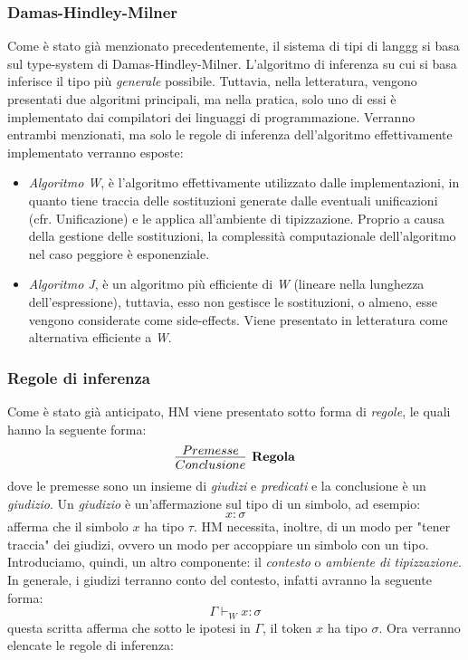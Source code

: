 \documentclass[10pt,a4paper]{article}
\begin{document}
\subsubsection{Damas-Hindley-Milner}
Come è stato già menzionato precedentemente, il sistema di tipi di langgg si basa sul type-system di Damas-Hindley-Milner.
L'algoritmo di inferenza su cui si basa inferisce il tipo più \textit{generale} possibile. Tuttavia, nella letteratura,
vengono presentati due algoritmi principali, ma nella pratica, solo uno di essi è implementato dai compilatori dei
linguaggi di programmazione. Verranno entrambi menzionati, ma solo le regole di inferenza dell'algoritmo effettivamente
implementato verranno esposte:
\begin{itemize}
    \item \textit{Algoritmo W}, è l'algoritmo effettivamente utilizzato dalle implementazioni, in quanto tiene traccia
    delle sostituzioni generate dalle eventuali unificazioni (cfr. Unificazione) e le applica all'ambiente di
    tipizzazione. Proprio a causa della gestione delle sostituzioni, la complessità computazionale dell'algoritmo
    nel caso peggiore è esponenziale.
    \item \textit{Algoritmo J}, è un algoritmo più efficiente di \textit{W} (lineare nella lunghezza dell'espressione),
    tuttavia, esso non gestisce le sostituzioni, o almeno, esse vengono considerate come side-effects. Viene
    presentato in letteratura come alternativa efficiente a \textit{W}.
\end{itemize}

\subsubsection{Regole di inferenza}
Come è stato già anticipato, HM viene presentato sotto forma di \textit{regole}, le quali hanno la seguente forma:
\newline
\[ \infer[\textbf{Regola}]{Conclusione}{Premesse} \]
dove le premesse sono un insieme di \textit{giudizi} e \textit{predicati} e la conclusione è un \textit{giudizio}. Un
\textit{giudizio} è un'affermazione sul tipo di un simbolo, ad esempio:
\[ x : \sigma \]
afferma che il simbolo $ x $ ha tipo $ \tau $. HM necessita, inoltre, di un modo per "tener traccia" dei giudizi,
ovvero un modo per accoppiare un simbolo con un tipo. Introduciamo, quindi,
un altro componente: il \textit{contesto} o \textit{ambiente di tipizzazione}. In generale, i giudizi terranno conto
del contesto, infatti avranno la seguente forma:
\[ \Gamma \vdash_W x : \sigma \]
questa scritta afferma che sotto le ipotesi in $ \Gamma $, il token $ x $ ha tipo $ \sigma $.
Ora verranno elencate le regole di inferenza:
\end{document}
